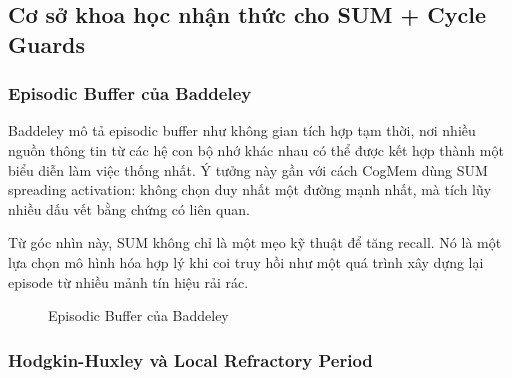 \documentclass[../main.tex]{subfiles}
\begin{document}
\subsection{Cơ sở khoa học nhận thức cho SUM + Cycle Guards}

\subsubsection{Episodic Buffer của Baddeley}

Baddeley mô tả episodic buffer như không gian tích hợp tạm thời, nơi nhiều nguồn thông tin từ các hệ con bộ nhớ khác nhau có thể được kết hợp thành một biểu diễn làm việc thống nhất. Ý tưởng này gần với cách CogMem dùng SUM spreading activation: không chọn duy nhất một đường mạnh nhất, mà tích lũy nhiều dấu vết bằng chứng có liên quan.

Từ góc nhìn này, SUM không chỉ là một mẹo kỹ thuật để tăng recall. Nó là một lựa chọn mô hình hóa hợp lý khi coi truy hồi như một quá trình xây dựng lại episode từ nhiều mảnh tín hiệu rải rác.

\begin{figure}[H]
\centering
{}
\caption{Episodic Buffer của Baddeley}
\label{fig:ch4_episodic_buffer}
\end{figure}

\subsubsection{Hodgkin-Huxley và Local Refractory Period}
\end{document}
